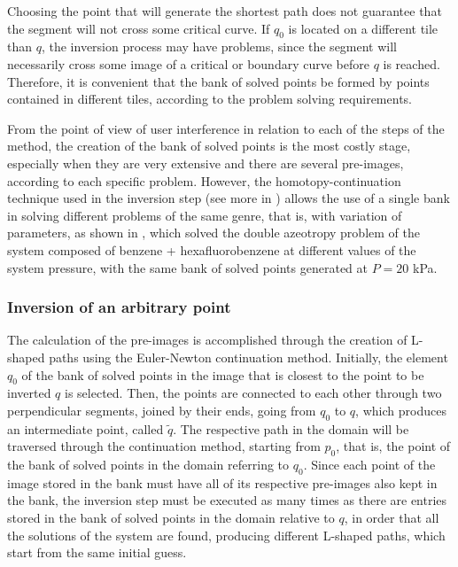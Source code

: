 \documentclass[journal=iecred,manuscript=article]{achemso}
\theoremstyle{definition}
\theoremstyle{remark}
\begin{document}
Choosing the point that will generate the shortest path does not guarantee that the segment will not cross some critical curve. If $ q_{0} $ is located on a different tile than $ q $, the inversion process may have problems, since the segment will necessarily cross some image of a critical or boundary curve before $ q $ is reached. Therefore, it is convenient that the bank of solved points be formed by points contained in different tiles, according to the problem solving requirements.

From the point of view of user interference in relation to each of the steps of the method, the creation of the bank of solved points is the most costly stage, especially when they are very extensive and there are several pre-images, according to each specific problem. However, the homotopy-continuation technique used in the inversion step (see more in \citet{allgower}) allows the use of a single bank in solving different problems of the same genre, that is, with variation of parameters, as shown in \citet{canadian}, which solved the double azeotropy problem of the system composed of benzene + hexafluorobenzene at different values of the system pressure, with the same bank of solved points generated at $ P = 20 $ kPa.
 
\subsubsection{Inversion of an arbitrary point}

The calculation of the pre-images is accomplished through the creation of L-shaped paths using the Euler-Newton continuation method. Initially, the element $ q_{0} $ of the bank of solved points in the image that is closest to the point to be inverted $ q $ is selected. Then, the points are connected to each other through two perpendicular segments, joined by their ends, going from $ q_{0} $ to $ q $, which produces an intermediate point, called $ \tilde{q} $. The respective path in the domain will be traversed through the continuation method, starting from $ p_{0} $, that is, the point of the bank of solved points in the domain referring to $ q_{0} $. Since each point of the image stored in the bank must have all of its respective pre-images also kept in the bank, the inversion step must be executed as many times as there are entries stored in the bank of solved points in the domain relative to $ q $, in order that all the solutions of the system are found, producing different L-shaped paths, which start from the same initial guess.
\end{document}
